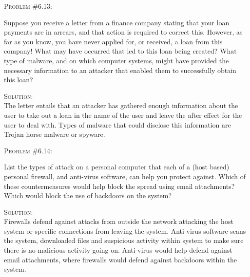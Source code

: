 \documentclass[12pt]{article}
\newenvironment{problem}[1]
{\begin{mdframed}[linewidth=0.8pt]
        \textsc{Problem #1:}

}
    {\end{mdframed}}
\newenvironment{solution}
    {\textsc{Solution:}\\}
    {\newpage}%
\begin{document}
	\begin{problem}{\#6.13}
		Suppose you receive a letter from a finance company stating that your loan payments are in arrears, and that action is required to correct this. However, as far as you know, you have never applied for, or received, a loan from this company! What may have occurred that led to this loan being created? What type of malware, and on which computer systems, might have provided the necessary information to an attacker that enabled them to successfully obtain this loan? 
	\end{problem}
	\begin{solution}
		The letter entails that an attacker has gathered enough information about the user to take out a loan in the name of the user and leave the after effect for the user to deal with. Types of malware that could disclose this information are Trojan horse malware or spyware.
	\end{solution}

	\begin{problem}{\#6.14}
		List the types of attack on a personal computer that each of a (host based) personal firewall, and anti-virus software, can help you protect against. Which of these countermeasures would help block the spread using email attachments? Which would block the use of backdoors on the system?
	\end{problem}
	\begin{solution}
		Firewalls defend against attacks from outside the network attacking the host system or specific connections from leaving the system. Anti-virus software scans the system, downloaded files and suspicious activity within system to make sure there is no malicious activity going on. Anti-virus would help defend against email attachments, where firewalls would defend against backdoors within the system. 
	\end{solution}
\end{document}

